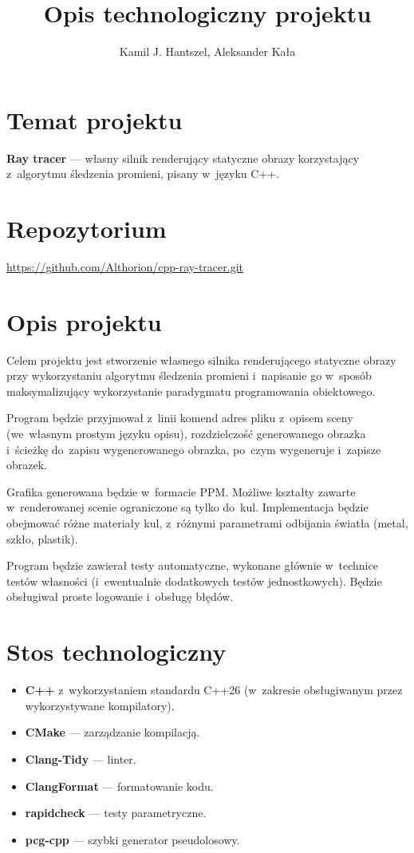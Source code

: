 \documentclass[12pt, a4paper]{article}
\author{Kamil J. Hantszel, Aleksander Kała}
\title{Opis technologiczny projektu}
\date{}
\begin{document}
\maketitle

\section{Temat projektu}
\textbf{Ray tracer} — własny silnik renderujący statyczne obrazy korzystający z algorytmu śledzenia promieni, pisany
w języku C++.

\section{Repozytorium}
\url{https://github.com/Althorion/cpp-ray-tracer.git}

\section{Opis projektu}
Celem projektu jest stworzenie własnego silnika renderującego statyczne obrazy przy wykorzystaniu algorytmu śledzenia
promieni i napisanie go w sposób maksymalizujący wykorzystanie paradygmatu programowania obiektowego.

Program będzie przyjmował z linii komend adres pliku z opisem sceny (we własnym prostym języku opisu), rozdzielczość
generowanego obrazka i ścieżkę do zapisu wygenerowanego obrazka, po czym wygeneruje i zapisze obrazek.

Grafika generowana będzie w formacie PPM. Możliwe kształty zawarte w renderowanej scenie ograniczone są tylko do kul.
Implementacja będzie obejmować różne materiały kul, z różnymi parametrami odbijania światła (metal, szkło, plastik).

Program będzie zawierał testy automatyczne, wykonane głównie w technice testów własności (i ewentualnie dodatkowych
testów jednostkowych). Będzie obsługiwał proste logowanie i obsługę błędów.

\section{Stos technologiczny}
\begin{itemize}
	\item \textbf{C++} z wykorzystaniem standardu C++26 (w zakresie obsługiwanym przez wykorzystywane kompilatory).
	\item \textbf{CMake} — zarządzanie kompilacją.
	\item \textbf{Clang-Tidy} — linter.
	\item \textbf{ClangFormat} — formatowanie kodu.
	\item \textbf{rapidcheck} — testy parametryczne.
	\item \textbf{pcg-cpp} — szybki generator pseudolosowy.
\end{itemize}
\end{document}
